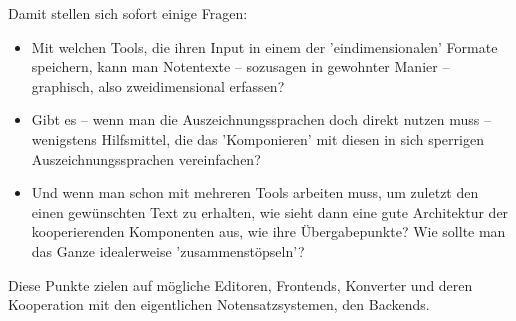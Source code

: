 Damit stellen sich sofort einige Fragen:

\begin{itemize}
  \item Mit welchen Tools, die ihren Input in einem der 'eindimensionalen'
  Formate speichern, kann man Notentexte -- sozusagen in gewohnter Manier
  -- graphisch, also zweidimensional erfassen?
  \item Gibt es -- wenn man die Auszeichnungssprachen doch direkt nutzen muss --
  wenigstens Hilfsmittel, die das 'Komponieren' mit diesen in sich sperrigen
  Auszeichnungssprachen vereinfachen?
  \item Und wenn man schon mit mehreren Tools arbeiten muss, um zuletzt den
  einen gewünschten Text zu erhalten, wie sieht dann eine gute Architektur der
  kooperierenden Komponenten aus, wie ihre Übergabepunkte? Wie sollte man das
  Ganze idealerweise 'zusammenstöpseln'?
\end{itemize}

Diese Punkte zielen auf mögliche Editoren, Frontends, Konverter und deren
Kooperation mit den eigentlichen Notensatzsystemen, den Backends. 

\begin{center}
\end{center}


